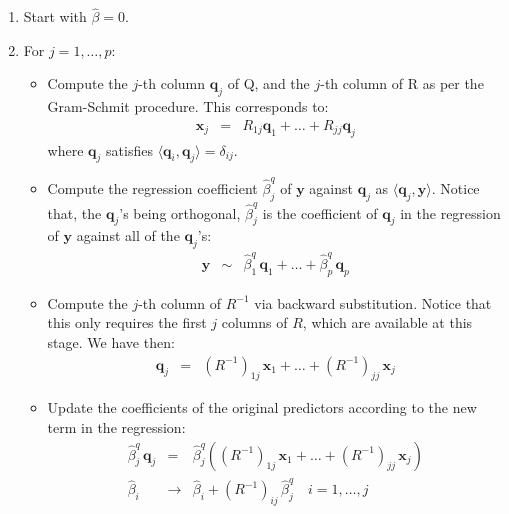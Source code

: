 \begin{enumerate}
	\item Start with $\hat{\beta} = 0$.
	\item For $j = 1, \ldots, p$:
	\begin{itemize}
		\item Compute the $j$-th column $\mathbf{q}_j$ of Q, and the $j$-th column of R as per
			the Gram-Schmit procedure. This corresponds to:
			\begin{eqnarray*}
			\mathbf{x}_j & = & R_{1j} \mathbf{q}_1 + \ldots + R_{jj} \mathbf{q}_j
			\end{eqnarray*}
			where $\mathbf{q}_j$ satisfies $\langle \mathbf{q}_i, \mathbf{q}_j \rangle = \delta_{ij}$.
		\item Compute the regression coefficient $\hat{\beta}_j^q$ of $\mathbf{y}$ against $\mathbf{q}_j$
			as $\langle \mathbf{q}_j, \mathbf{y} \rangle$. Notice that, the $\mathbf{q}_j$'s being orthogonal,
			$\hat{\beta}_j^q$ is the coefficient of $\mathbf{q}_j$ in the regression of $\mathbf{y}$ against
			all of the $\mathbf{q}_j$'s:
			\begin{eqnarray*}
				\mathbf{y} & \sim & \hat{\beta}^q_1\, \mathbf{q}_1 + \ldots + \hat{\beta}^q_p\, \mathbf{q}_p
			\end{eqnarray*}
		\item Compute the $j$-th column of $R^{-1}$ via backward substitution. Notice that this only 
		requires the first $j$ columns of $R$, which are available at this stage. We have then:
		\begin{eqnarray}
		\label{3p4_e1}
		\mathbf{q}_j & = & (R^{-1})_{1j}\,\mathbf{x}_1 + \ldots + (R^{-1})_{jj}\, \mathbf{x}_j
		\end{eqnarray}
		\item Update the coefficients of the original predictors according to the new term in the regression:
		\begin{eqnarray*}
		\hat{\beta}^q_j\, \mathbf{q}_j & = & \hat{\beta}^q_j \left( (R^{-1})_{1j}\,\mathbf{x}_1 + \ldots + (R^{-1})_{jj}\, \mathbf{x}_j \right)\\
		\hat{\beta}_i &\rightarrow& \hat{\beta}_i + (R^{-1})_{ij}\,\hat{\beta}^q_j \quad i = 1,\ldots,j
		\end{eqnarray*}
	\end{itemize}
\end{enumerate}

